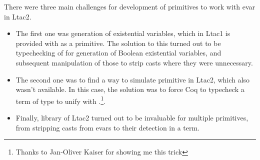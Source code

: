 There were three main challenges for development of primitives to work with evar in Ltac2.
\begin{itemize}
\item The first one was generation of existential variables, which in Ltac1 is provided with as a primitive.
  The solution to this turned out to be typechecking of  for generation of Boolean existential variables, and subsequent manipulation of those to strip casts where they were unnecessary.
\item The second one was to find a way to simulate  primitive in Ltac2, which also wasn't available.
  In this case, the solution was to force Coq to typecheck a term of type  to unify  with .\footnote{Thanks to Jan-Oliver Kaiser for showing me this trick}.
\item Finally,  library of Ltac2 turned out to be invaluable for multiple primitives, from stripping casts from evars to their detection in a term.
\end{itemize}

